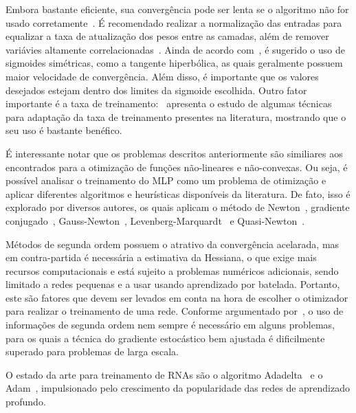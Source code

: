 \documentclass[conference]{IEEEtran}
\begin{document}
	Embora bastante eficiente, sua convergência pode ser lenta se o algoritmo não for usado corretamente~\cite{lecun1993efficient}. É recomendado realizar a normalização das entradas para equalizar a taxa de atualização dos pesos entre as camadas, além de remover variávies altamente correlacionadas~\cite{lecun2012efficient}. Ainda de acordo com~\cite{lecun2012efficient}, é sugerido o uso de sigmoides simétricas, como a tangente hiperbólica, as quais geralmente possuem maior velocidade de convergência. Além disso, é importante que os valores desejados estejam dentro dos limites da sigmoide escolhida. Outro fator importante é a taxa de treinamento:~\cite{magoulas1999improving} apresenta o estudo de algumas técnicas para adaptação da taxa de treinamento presentes na literatura, mostrando que o seu uso é bastante benéfico. 
	
	É interessante notar que os problemas descritos anteriormente são similiares aos encontrados para a otimização de funções não-lineares e não-convexas. Ou seja, é possível analisar o treinamento do MLP como um problema de otimização e aplicar diferentes algoritmos e heurísticas disponíveis da literatura. De fato, isso é explorado por diversos autores, os quais aplicam o método de Newton~\cite{becker1988improving}, gradiente conjugado~\cite{johansson1991backpropagation}, Gauss-Newton~\cite{battiti1992first}, Levenberg-Marquardt~\cite{hagan1994training} e Quasi-Newton~\cite{robitaille1996modified}.  
	
	Métodos de segunda ordem possuem o atrativo da convergência acelarada, mas em contra-partida é necessária a estimativa da Hessiana, o que exige mais recursos computacionais e está sujeito a problemas numéricos adicionais, sendo limitado a redes pequenas e a usar usando aprendizado por batelada. Portanto, este são fatores que devem ser levados em conta na hora de escolher o otimizador para realizar o treinamento de uma rede. Conforme argumentado por~\cite{lecun2012efficient}, o uso de informações de segunda ordem nem sempre é necessário em alguns problemas, para os quais a técnica do gradiente estocástico bem ajustada é dificilmente superado para problemas de larga escala.
	
	O estado da arte para treinamento de RNAs são o algoritmo Adadelta~\cite{zeiler2012adadelta} e o Adam~\cite{kingma2014adam}, impulsionado pelo crescimento da popularidade das redes de aprendizado profundo. 
	
\end{document}
